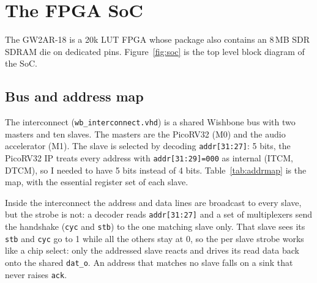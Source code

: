 \documentclass[a4paper,10pt]{article}
\begin{document}
\section{The FPGA SoC}
\label{sec:soc}

The GW2AR-18 is a 20k LUT FPGA whose package also contains an 8\,MB SDR SDRAM die on
dedicated pins. Figure~\ref{fig:soc} is the top level block diagram of the SoC.

\subsection{Bus and address map}

The interconnect (\texttt{wb\_interconnect.vhd}) is a shared Wishbone bus with two
masters and ten slaves. The masters are the PicoRV32 (M0) and the audio accelerator
(M1). The slave is selected by decoding \texttt{addr[31:27]}: 5 bits,
 the PicoRV32 IP treats every address with \texttt{addr[31:29]=000} as internal
(ITCM, DTCM), so I needed to have 5 bits instead of 4 bits. \newline
Table~\ref{tab:addrmap} is the map, with the essential register set of
each slave.

Inside the interconnect the address and data lines are broadcast to every slave, but the
strobe is not: a decoder reads \texttt{addr[31:27]} and a set of multiplexers send the
handshake (\texttt{cyc} and \texttt{stb}) to the one matching slave only. That slave sees
its \texttt{stb} and \texttt{cyc} go to 1 while all the others stay at 0, so the per slave
strobe works like a chip select: only the addressed slave reacts and drives its read data
back onto the shared \texttt{dat\_o}. An address that matches no slave falls on a sink that
never raises \texttt{ack}.
\end{document}
